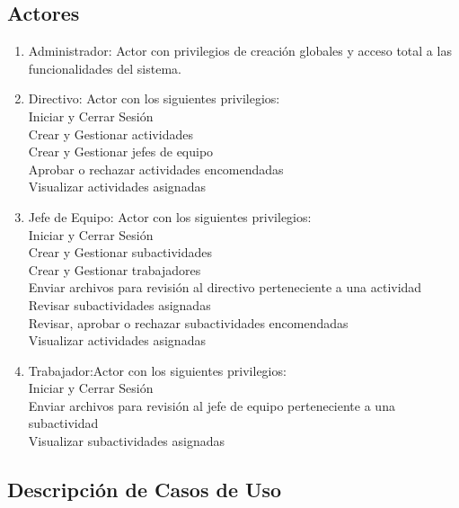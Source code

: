 \documentclass[11pt,a4paper]{article}
\begin{document}
\subsection{Actores}
\begin{enumerate}
\item Administrador: Actor con privilegios de creación globales y acceso total a las funcionalidades del sistema.


\item Directivo: Actor con los siguientes privilegios: 
\\Iniciar y Cerrar Sesión
\\Crear y Gestionar actividades
\\Crear y Gestionar jefes de equipo
\\Aprobar o rechazar actividades encomendadas
\\Visualizar actividades asignadas

\item Jefe de Equipo: Actor con los siguientes privilegios: 
\\Iniciar y Cerrar Sesión
\\Crear y Gestionar subactividades
\\Crear y Gestionar trabajadores
\\Enviar archivos para revisión al directivo perteneciente a una actividad
\\Revisar subactividades asignadas
\\Revisar, aprobar o rechazar subactividades encomendadas
\\Visualizar actividades asignadas

\item Trabajador:Actor con los siguientes privilegios: 
\\Iniciar y Cerrar Sesión
\\Enviar archivos para revisión al jefe de equipo perteneciente a una subactividad
\\Visualizar subactividades asignadas 

\end{enumerate}

\subsection{Descripción de Casos de Uso}
\end{document}
